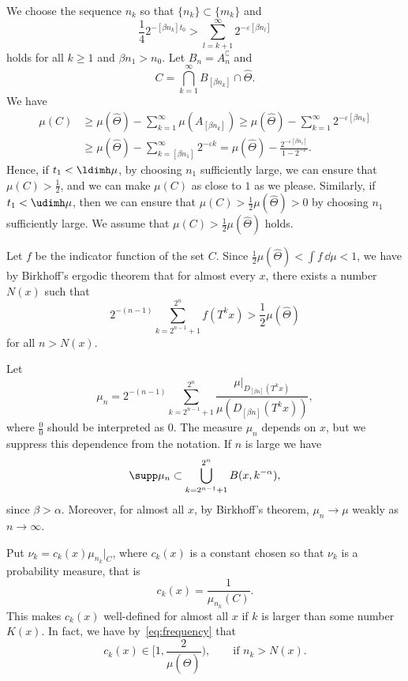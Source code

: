 We choose the sequence $n_k$ so that $\{n_k\} \subset \{m_k\}$ and
\begin{equation}\label{eq:nk2}
\frac{1}{4} 2^{- [\beta n_k] t_0} > \sum_{l = k+1}^\infty 2^{-
\varepsilon [\beta n_l]}
\end{equation}
holds for all $k \geq 1$ and $\beta n_1 > n_0$. Let $B_n = A_n^\complement$ and
\[
C = \bigcap_{k=1}^\infty B_{[\beta n_k]} \cap \hat{\Theta}.
\]
We have
\begin{align*}
\mu (C) &\geq \mu (\hat{\Theta}) - \sum_{k=1}^\infty \mu (A_{[\beta n_k]}) \geq \mu (\hat{\Theta}) - \sum_{k=1}^\infty 2^{-
\varepsilon [\beta n_k]} \\ &\geq \mu (\hat{\Theta}) -
\sum_{k=[\beta n_1]}^\infty 2^{-\varepsilon k} = \mu (\hat{\Theta}) - \frac{2^{-\varepsilon [\beta n_1]}}{1 - 2^{-\varepsilon}}.
\end{align*}
Hence, if $t_1 < \ldimh \mu$, by choosing $n_1$ sufficiently large, we can ensure that $\mu (C) > \frac{1}{2}$, and we can make $\mu (C)$ as close to $1$ as we please. Similarly, if $t_1 < \udimh \mu$, then we can ensure that $\mu (C) > \frac{1}{2} \mu (\hat{\Theta}) > 0$ by choosing $n_1$ sufficiently large. We assume that $\mu (C) >
\frac{1}{2} \mu (\hat{\Theta})$ holds.

Let $f$ be the indicator function of the set $C$. Since $\frac{1}{2}
\mu (\hat{\Theta}) < \int f \, \dd \mu < 1$, we have by Birkhoff's ergodic theorem that for almost every $x$, there exists a number $N(x)$ such that
\begin{equation}\label{eq:frequency}
2^{-(n-1)} \sum_{k = 2^{n-1} + 1}^{2^n} f (T^k x) > \frac{1}{2} \mu (\hat{\Theta})
\end{equation}
for all $n > N (x)$.

Let
\[
\mu_n = 2^{-(n-1)} \sum_{k = 2^{n-1} + 1}^{2^n} \frac{\mu |_{D_{[\beta n]} (T^k x)}}{\mu (D_{[\beta n]} (T^k x))},
\]
where $\frac{0}{0}$ should be interpreted as $0$. The measure $\mu_n$ depends on $x$, but we suppress this dependence from the notation. If $n$ is large we have
\[
\supp \mu_n \subset \bigcup_{k = 2^{n-1}+1}^{2^n} B(x,k^{-\alpha}),
\]
since $\beta > \alpha$. Moreover, for almost all $x$, by Birkhoff's theorem, $\mu_n \to \mu$ weakly as $n \to \infty$.

Put $\nu_k = c_k(x) \mu_{n_k}|_C$, where $c_k (x)$ is a constant chosen so that $\nu_k$ is a probability measure, that is
\[
c_k (x) = \frac{1}{\mu_{n_k} (C)}.
\]
This makes $c_k (x)$ well-defined for almost all $x$ if $k$ is larger than some number $K(x)$. In fact, we have by~\eqref{eq:frequency} that
\[
c_k (x) \in \biggl[1,\frac{2}{\mu(\hat{\Theta})} \biggr), \qquad
\text{if } n_k > N(x).
\]

